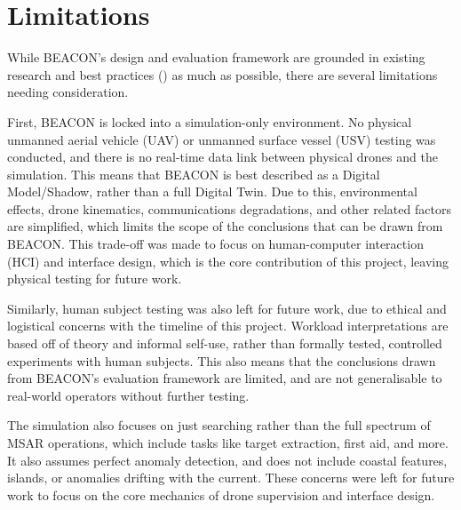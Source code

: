 \section{Limitations}\label{sec:limitations}

While BEACON's design and evaluation framework are grounded in existing research and best practices (\cite{waharte2010supporting,7761074,messmer2024uavassistedmaritimesearchrescue,CUMMINGS2007339,AUTOMATIONEFFECTONUAVROUTING,situation_awareness,BABAEI2025103515,doi:10.1518/001872095779049408}) as much as possible, there are several limitations needing consideration.

First, BEACON is locked into a simulation-only environment.
No physical unmanned aerial vehicle (UAV) or unmanned surface vessel (USV) testing was conducted, and there is no real-time data link between physical drones and the simulation.
This means that BEACON is best described as a Digital Model/Shadow, rather than a full Digital Twin.
Due to this, environmental effects, drone kinematics, communications degradations, and other related factors are simplified, which limits the scope of the conclusions that can be drawn from BEACON\@.
This trade-off was made to focus on human-computer interaction (HCI) and interface design, which is the core contribution of this project, leaving physical testing for future work.

Similarly, human subject testing was also left for future work, due to ethical and logistical concerns with the timeline of this project.
Workload interpretations are based off of theory and informal self-use, rather than formally tested, controlled experiments with human subjects.
This also means that the conclusions drawn from BEACON's evaluation framework are limited, and are not generalisable to real-world operators without further testing.

The simulation also focuses on just searching rather than the full spectrum of MSAR operations, which include tasks like target extraction, first aid, and more.
It also assumes perfect anomaly detection, and does not include coastal features, islands, or anomalies drifting with the current.
These concerns were left for future work to focus on the core mechanics of drone supervision and interface design.
